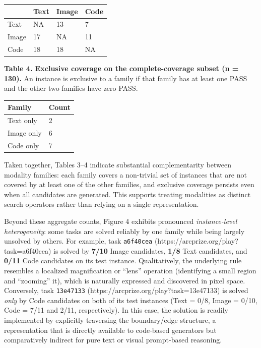 \documentclass[11pt]{article}
\begin{document}
\begin{longtable}[]{@{}llll@{}}
\toprule\noalign{}
& Text & Image & Code \\
\midrule\noalign{}
\endhead
\bottomrule\noalign{}
\endlastfoot
Text & NA & 13 & 7 \\
Image & 17 & NA & 11 \\
Code & 18 & 18 & NA \\
\end{longtable}

\textbf{Table 4. Exclusive coverage on the complete-coverage subset (n =
130).} An instance is exclusive to a family if that family has at least
one PASS and the other two families have zero PASS.

\begin{longtable}[]{@{}ll@{}}
\toprule\noalign{}
Family & Count \\
\midrule\noalign{}
\endhead
\bottomrule\noalign{}
\endlastfoot
Text only & 2 \\
Image only & 6 \\
Code only & 7 \\
\end{longtable}

Taken together, Tables 3--4 indicate substantial complementarity between
modality families: each family covers a non-trivial set of instances
that are not covered by at least one of the other families, and
exclusive coverage persists even when all candidates are generated. This
supports treating modalities as distinct search operators rather than
relying on a single representation.

Beyond these aggregate counts, Figure 4 exhibits pronounced
\emph{instance-level heterogeneity}: some tasks are solved reliably by
one family while being largely unsolved by others. For example, task
\texttt{a6f40cea} (https://arcprize.org/play?task=a6f40cea) is solved by
\textbf{7/10} Image candidates, \textbf{1/8} Text candidates, and
\textbf{0/11} Code candidates on its test instance. Qualitatively, the
underlying rule resembles a localized magnification or ``lens''
operation (identifying a small region and ``zooming'' it), which is
naturally expressed and discovered in pixel space. Conversely, task
\texttt{13e47133} (https://arcprize.org/play?task=13e47133) is solved
\emph{only} by Code candidates on both of its test instances (Text =
0/8, Image = 0/10, Code = 7/11 and 2/11, respectively). In this case,
the solution is readily implemented by explicitly traversing the
boundary/edge structure, a representation that is directly available to
code-based generators but comparatively indirect for pure text or visual
prompt-based reasoning.
\end{document}
